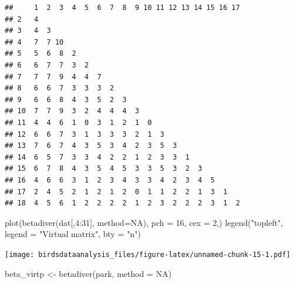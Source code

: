 \documentclass[
]{article}
\newenvironment{Shaded}{\begin{snugshade}}{\end{snugshade}}
\newcommand{\AttributeTok}[1]{\textcolor[rgb]{0.77,0.63,0.00}{#1}}
\newcommand{\ConstantTok}[1]{\textcolor[rgb]{0.00,0.00,0.00}{#1}}
\newcommand{\DecValTok}[1]{\textcolor[rgb]{0.00,0.00,0.81}{#1}}
\newcommand{\FunctionTok}[1]{\textcolor[rgb]{0.00,0.00,0.00}{#1}}
\newcommand{\NormalTok}[1]{#1}
\newcommand{\OtherTok}[1]{\textcolor[rgb]{0.56,0.35,0.01}{#1}}
\newcommand{\SpecialCharTok}[1]{\textcolor[rgb]{0.00,0.00,0.00}{#1}}
\newcommand{\StringTok}[1]{\textcolor[rgb]{0.31,0.60,0.02}{#1}}
\begin{document}
\begin{Shaded}
\end{Shaded}

\begin{verbatim}
##     1  2  3  4  5  6  7  8  9 10 11 12 13 14 15 16 17
## 2   4                                                
## 3   4  3                                             
## 4   7  7 10                                          
## 5   5  6  8  2                                       
## 6   6  7  7  3  2                                    
## 7   7  7  9  4  4  7                                 
## 8   6  6  7  3  3  3  2                              
## 9   6  6  8  4  3  5  2  3                           
## 10  7  7  9  3  2  4  4  4  3                        
## 11  4  4  6  1  0  3  1  2  1  0                     
## 12  6  6  7  3  1  3  3  3  2  1  3                  
## 13  7  6  7  4  3  5  3  4  2  3  5  3               
## 14  6  5  7  3  3  4  2  2  1  2  3  3  1            
## 15  6  7  8  4  3  5  4  5  3  3  5  3  2  3         
## 16  4  6  6  3  1  2  3  4  3  3  4  2  3  4  5      
## 17  2  4  5  2  1  2  1  2  0  1  1  2  2  1  3  1   
## 18  4  5  6  1  2  2  2  2  1  2  3  2  2  2  3  1  2
\end{verbatim}

\begin{Shaded}
\begin{Highlighting}[]
\FunctionTok{plot}\NormalTok{(}\FunctionTok{betadiver}\NormalTok{(dat[,}\DecValTok{4}\SpecialCharTok{:}\DecValTok{31}\NormalTok{], }\AttributeTok{method=}\ConstantTok{NA}\NormalTok{), }\AttributeTok{pch =} \DecValTok{16}\NormalTok{, }\AttributeTok{cex =} \DecValTok{2}\NormalTok{,)}
\FunctionTok{legend}\NormalTok{(}\StringTok{"topleft"}\NormalTok{, }\AttributeTok{legend =} \StringTok{"Virtual matrix"}\NormalTok{, }\AttributeTok{bty =} \StringTok{"n"}\NormalTok{)}
\end{Highlighting}
\end{Shaded}

\texttt{[image: birdsdataanalysis\_files/figure-latex/unnamed-chunk-15-1.pdf]}

\begin{Shaded}
\begin{Highlighting}[]
\NormalTok{beta\_virtp }\OtherTok{\textless{}{-}} \FunctionTok{betadiver}\NormalTok{(park, }\AttributeTok{method =} \ConstantTok{NA}\NormalTok{)}
\end{Highlighting}
\end{Shaded}
\end{document}

